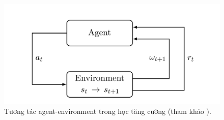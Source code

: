 \begin{enumerate}
          \begin{figure}[t]
              \begin{center}
                  \includegraphics[width=\linewidth]{asset/image/rl.png}
                  \caption{Tương tác agent-environment trong học tăng cường (tham khảo \cite{franccois2018introduction}). }
                  \label{fig:semi2}
              \end{center}
          \end{figure}
\end{enumerate}


